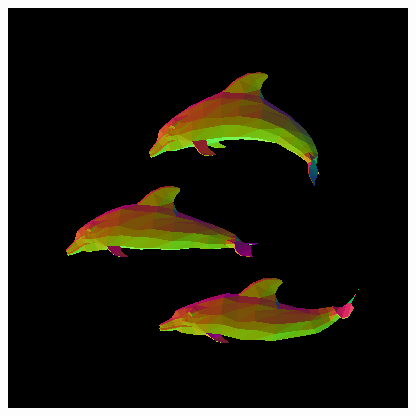 \documentclass{beamer}
\begin{document}
\begin{frame}
\begin{columns}[T]
\begin{column}{.45\textwidth}
\begin{figure}
				\includegraphics[width=\textwidth]{dolphins-normal-incorrect}
			\end{figure}
		\end{column}
	\end{columns}
\end{frame}
\end{document}
